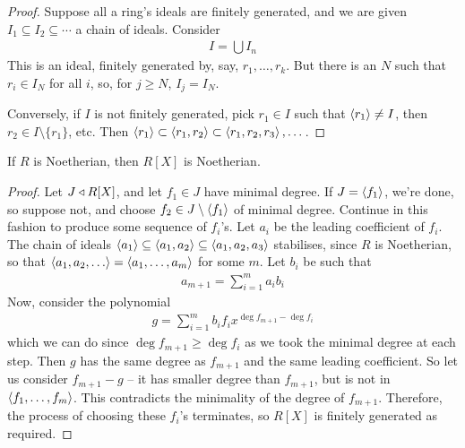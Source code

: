 \documentclass{../template/note}
\begin{document}
    \begin{proof}
        Suppose all a ring's ideals are finitely generated, and we are given $I_1 \subseteq I_2 \subseteq \cdots$ a chain of ideals. Consider
        \begin{align*}
            I = \bigcup I_n
        \end{align*}
        This is an ideal, finitely generated by, say, $r_1, \dots, r_k$. But there is an $N$ such that $r_i \in I_N$ for all $i$, so, for $j \geq N$, $I_j = I_N$.

        Conversely, if $I$ is not finitely generated, pick $r_1 \in I$ such that $\left \langle r_1 \right \rangle \neq I$, then $r_2 \in I \setminus \{r_1\}$, etc. Then $\left \langle r_1 \right \rangle \subset \left \langle r_1, r_2 \right \rangle \subset \left \langle r_1, r_2, r_3 \right \rangle, \dots$.
    \end{proof}
    
    \begin{theorem}
        If $R$ is Noetherian, then $R[X]$ is Noetherian.
    \end{theorem}
    
    \begin{proof}
        Let $J \triangleleft R[X]$, and let $f_1 \in J$ have minimal degree. If $J = \left \langle f_1 \right \rangle$, we're done, so suppose not, and choose $f_2 \in J \setminus \left \langle f_1 \right \rangle$ of minimal degree. Continue in this fashion to produce some sequence of $f_i$'s. Let $a_i$ be the leading coefficient of $f_i$. The chain of ideals $\left \langle a_1 \right \rangle \subseteq \left \langle a_1, a_2 \right \rangle \subseteq \left \langle a_1, a_2, a_3 \right \rangle$ stabilises, since $R$ is Noetherian, so that $\gen{a_1, a_2, \dots} = \gen{a_1, \dots, a_m}$ for some $m$. Let $b_i$ be such that
        \begin{align*}
            a_{m+1} = \sum_{i=1}^m a_ib_i
        \end{align*}
        Now, consider the polynomial
        \begin{align*}
            g = \sum_{i=1}^m b_if_i x^{\deg{f_{m+1}}-\deg{f_i}}
        \end{align*}
        which we can do since $\deg{f_{m+1}} \geq \deg{f_i}$ as we took the minimal degree at each step. Then $g$ has the same degree as $f_{m+1}$ and the same leading coefficient. So let us consider $f_{m+1}-g$ -- it has smaller degree than $f_{m+1}$, but is not in $\left \langle f_1, \dots, f_m \right \rangle$. This contradicts the minimality of the degree of $f_{m+1}$. Therefore, the process of choosing these $f_i$'s terminates, so $R[X]$ is finitely generated as required.
    \end{proof}
    
\end{document}
